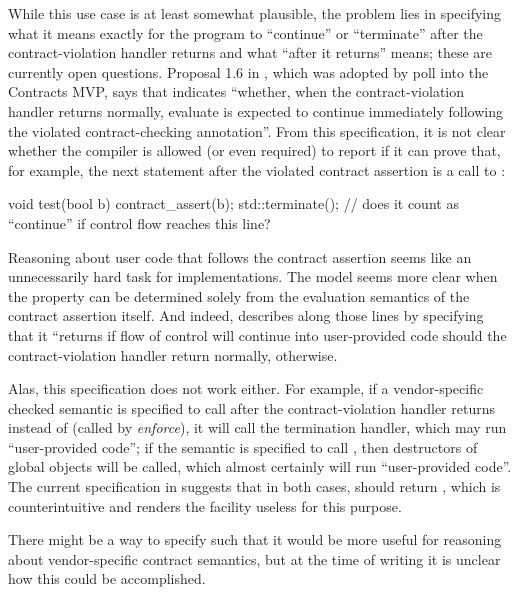 While this use case is at least somewhat plausible, the problem lies in specifying what it means exactly for the program to ``continue'' or ``terminate'' after the contract-violation handler returns and what ``after it returns'' means; these are currently open questions. Proposal 1.6 in \cite{P2811R5}, which was adopted by poll into the Contracts MVP, says that  indicates ``whether, when the contract-violation handler returns normally, evaluate is expected to continue immediately following the violated contract-checking annotation''. From this specification, it is not clear whether the compiler is allowed (or even required) to report  if it can prove that, for example, the next statement after the violated contract assertion is a call to :
\begin{codeblock}
void test(bool b) {
  contract_assert(b);
  std::terminate();  // does it count as ``continue'' if control flow reaches this line?
}
\end{codeblock}
Reasoning about user code that follows the contract assertion seems like an unnecessarily hard task for implementations. The model seems more clear when the property  can be determined solely from the evaluation semantics of the contract assertion itself. And indeed, \cite{P2900R4} describes  along those lines by specifying that it ``returns  if flow of control will continue into user-provided code should the contract-violation handler return normally,  otherwise. 

Alas, this specification does not work either. For example, if a vendor-specific checked semantic is specified to call  after the contract-violation handler returns instead of  (called by \emph{enforce}), it will call the termination handler, which may run ``user-provided code''; if the semantic is specified to call , then destructors of global objects will be called, which almost certainly will run ``user-provided code''. The current specification in \cite{P2900R4} suggests that in both cases,   should return , which is counterintuitive and renders the facility useless for this purpose.

There might be a way to specify   such that it would be more useful for reasoning about vendor-specific contract semantics, but at the time of writing it is unclear how this could be accomplished.

